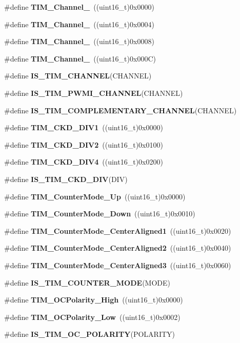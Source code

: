 \begin{DoxyCompactItemize}
\item 
\#define \textbf{ T\+I\+M\+\_\+\+Channel\+\_}~((uint16\+\_\+t)0x0000)
\item 
\#define \textbf{ T\+I\+M\+\_\+\+Channel\+\_}~((uint16\+\_\+t)0x0004)
\item 
\#define \textbf{ T\+I\+M\+\_\+\+Channel\+\_}~((uint16\+\_\+t)0x0008)
\item 
\#define \textbf{ T\+I\+M\+\_\+\+Channel\+\_}~((uint16\+\_\+t)0x000\+C)
\item 
\#define \textbf{ I\+S\+\_\+\+T\+I\+M\+\_\+\+C\+H\+A\+N\+N\+EL}(C\+H\+A\+N\+N\+EL)
\item 
\#define \textbf{ I\+S\+\_\+\+T\+I\+M\+\_\+\+P\+W\+M\+I\+\_\+\+C\+H\+A\+N\+N\+EL}(C\+H\+A\+N\+N\+EL)
\item 
\#define \textbf{ I\+S\+\_\+\+T\+I\+M\+\_\+\+C\+O\+M\+P\+L\+E\+M\+E\+N\+T\+A\+R\+Y\+\_\+\+C\+H\+A\+N\+N\+EL}(C\+H\+A\+N\+N\+EL)
\item 
\#define \textbf{ T\+I\+M\+\_\+\+C\+K\+D\+\_\+\+D\+I\+V1}~((uint16\+\_\+t)0x0000)
\item 
\#define \textbf{ T\+I\+M\+\_\+\+C\+K\+D\+\_\+\+D\+I\+V2}~((uint16\+\_\+t)0x0100)
\item 
\#define \textbf{ T\+I\+M\+\_\+\+C\+K\+D\+\_\+\+D\+I\+V4}~((uint16\+\_\+t)0x0200)
\item 
\#define \textbf{ I\+S\+\_\+\+T\+I\+M\+\_\+\+C\+K\+D\+\_\+\+D\+IV}(D\+IV)
\item 
\#define \textbf{ T\+I\+M\+\_\+\+Counter\+Mode\+\_\+\+Up}~((uint16\+\_\+t)0x0000)
\item 
\#define \textbf{ T\+I\+M\+\_\+\+Counter\+Mode\+\_\+\+Down}~((uint16\+\_\+t)0x0010)
\item 
\#define \textbf{ T\+I\+M\+\_\+\+Counter\+Mode\+\_\+\+Center\+Aligned1}~((uint16\+\_\+t)0x0020)
\item 
\#define \textbf{ T\+I\+M\+\_\+\+Counter\+Mode\+\_\+\+Center\+Aligned2}~((uint16\+\_\+t)0x0040)
\item 
\#define \textbf{ T\+I\+M\+\_\+\+Counter\+Mode\+\_\+\+Center\+Aligned3}~((uint16\+\_\+t)0x0060)
\item 
\#define \textbf{ I\+S\+\_\+\+T\+I\+M\+\_\+\+C\+O\+U\+N\+T\+E\+R\+\_\+\+M\+O\+DE}(M\+O\+DE)
\item 
\#define \textbf{ T\+I\+M\+\_\+\+O\+C\+Polarity\+\_\+\+High}~((uint16\+\_\+t)0x0000)
\item 
\#define \textbf{ T\+I\+M\+\_\+\+O\+C\+Polarity\+\_\+\+Low}~((uint16\+\_\+t)0x0002)
\item 
\#define \textbf{ I\+S\+\_\+\+T\+I\+M\+\_\+\+O\+C\+\_\+\+P\+O\+L\+A\+R\+I\+TY}(P\+O\+L\+A\+R\+I\+TY)

\end{DoxyCompactItemize}
